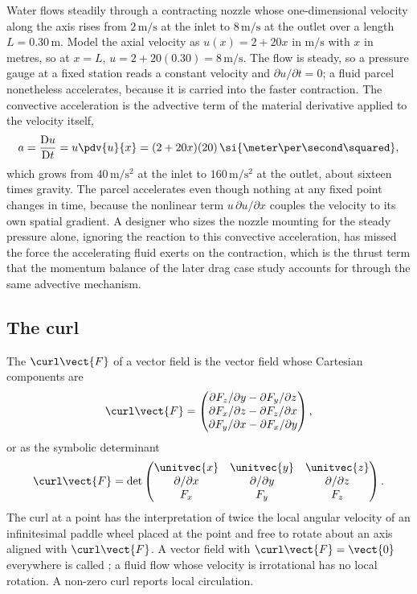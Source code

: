 \begin{example}
Water flows steadily through a contracting nozzle whose one-dimensional
velocity along the axis rises from $2\,\si{\meter\per\second}$ at the
inlet to $8\,\si{\meter\per\second}$ at the outlet over a length
$L = 0.30\,\si{\meter}$. Model the axial velocity as $u(x) = 2 + 20x$
in $\si{\meter\per\second}$ with $x$ in metres, so at $x = L$,
$u = 2 + 20(0.30) = 8\,\si{\meter\per\second}$. The flow is steady,
so a pressure gauge at a fixed station reads a constant velocity and
$\partial u/\partial t = 0$; a fluid parcel nonetheless accelerates,
because it is carried into the faster contraction. The convective
acceleration is the advective term of the material derivative applied
to the velocity itself,
\[
a = \frac{\mathrm{D}u}{\mathrm{D}t} = u\pdv{u}{x} = (2 + 20x)(20)\,
\si{\meter\per\second\squared},
\]
which grows from $40\,\si{\meter\per\second\squared}$ at the inlet to
$160\,\si{\meter\per\second\squared}$ at the outlet, about sixteen
times gravity. The parcel accelerates even though nothing at any fixed
point changes in time, because the nonlinear term $u\,\partial u/
\partial x$ couples the velocity to its own spatial gradient. A
designer who sizes the nozzle mounting for the steady pressure alone,
ignoring the reaction to this convective acceleration, has missed the
force the accelerating fluid exerts on the contraction, which is the
thrust term that the momentum balance of the later drag case study
accounts for through the same advective mechanism.
\end{example}

\subsection{The curl}

The  $\curl\vect{F}$ of a vector field is the vector
field whose Cartesian components are
\[
\curl\vect{F} =
\begin{pmatrix}
\partial F_{z}/\partial y - \partial F_{y}/\partial z \\
\partial F_{x}/\partial z - \partial F_{z}/\partial x \\
\partial F_{y}/\partial x - \partial F_{x}/\partial y
\end{pmatrix},
\]
or as the symbolic determinant
\[
\curl\vect{F} = \det
\begin{pmatrix}
\unitvec{x} & \unitvec{y} & \unitvec{z} \\
\partial/\partial x & \partial/\partial y & \partial/\partial z \\
F_{x} & F_{y} & F_{z}
\end{pmatrix}.
\]
The curl at a point has the interpretation of twice the local
angular velocity of an infinitesimal paddle wheel placed at the
point and free to rotate about an axis aligned with $\curl\vect{F}$.
A vector field with $\curl\vect{F} = \vect{0}$ everywhere is called
; a fluid flow whose velocity is irrotational
has no local rotation. A non-zero curl reports local circulation.

